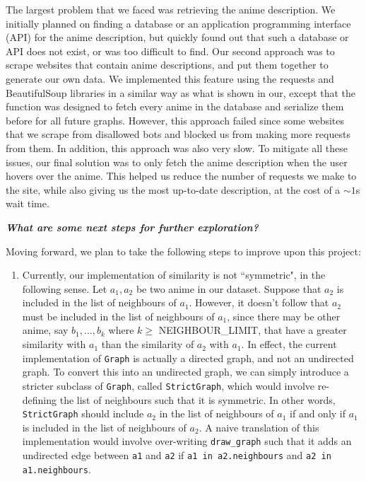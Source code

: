 \documentclass[12pt]{article}
\begin{document}
\begin{enumerate}
\begin{text}
The largest problem that we faced was retrieving the anime description. We initially planned on finding a database or an application programming interface (API) for the anime description, but quickly found out that such a database or API does not exist, or was too difficult to find. Our second approach was to scrape websites that contain anime descriptions, and put them together to generate our own data. We implemented this feature using the requests and BeautifulSoup libraries in a similar way as what is shown in our, except that the function was designed to fetch every anime in the database and serialize them before for all future graphs. However, this approach failed since some websites that we scrape from disallowed bots and blocked us from making more requests from them. In addition, this approach was also very slow. To mitigate all these issues, our final solution was to only fetch the anime description when the user hovers over the anime. This helped us reduce the number of requests we make to the site, while also giving us the most up-to-date description, at the cost of a $\sim1$s wait time.

\bigskip

\textbf{\textit{What are some next steps for further exploration?}}

Moving forward, we plan to take the following steps to improve upon this project:

\begin{enumerate}
    \item Currently, our implementation of similarity is not ``symmetric", in the following sense. Let $a_1, a_2$ be two anime in our dataset. Suppose that $a_2$ is included in the list of neighbours of $a_1$. However, it doesn't follow that $a_2$ must be included in the list of neighbours of $a_1$, since there may be other anime, say $b_1, \ldots, b_k$ where $k \geq$ NEIGHBOUR\_LIMIT, that have a greater similarity with $a_1$ than the similarity of $a_2$ with $a_1$. In effect, the current implementation of \texttt{Graph} is actually a directed graph, and not an undirected graph. To convert this into an undirected graph, we can simply introduce a stricter subclass of \texttt{Graph}, called \texttt{StrictGraph}, which would involve re-defining the list of neighbours such that it is symmetric. In other words, \texttt{StrictGraph} should include $a_2$ in the list of neighbours of $a_1$ if and only if $a_1$ is included in the list of neighbours of $a_2$. A naive translation of this implementation would involve over-writing \texttt{draw\_graph} such that it adds an undirected edge between \texttt{a1} and \texttt{a2} if \texttt{a1 in a2.neighbours} and \texttt{a2 in a1.neighbours}.
    

\end{enumerate}
\end{text}
\end{enumerate}
\end{document}
